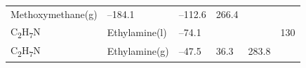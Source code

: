 \documentclass[
  9pt,
]{extbook}
\theoremstyle{definition}
\theoremstyle{definition}
\theoremstyle{definition}
\theoremstyle{remark}
\begin{document}
\begin{longtable}[]{@{}llllll@{}}
\begin{minipage}[t]{0.17\columnwidth}
Methoxymethane(g)\strut
\end{minipage} & \begin{minipage}[t]{0.15\columnwidth}\raggedright
--184.1\strut
\end{minipage} & \begin{minipage}[t]{0.15\columnwidth}\raggedright
--112.6\strut
\end{minipage} & \begin{minipage}[t]{0.14\columnwidth}\raggedright
266.4\strut
\end{minipage} & \begin{minipage}[t]{0.14\columnwidth}\raggedright
\strut
\end{minipage}\tabularnewline
\begin{minipage}[t]{0.07\columnwidth}\raggedright
C\textsubscript{2}H\textsubscript{7}N\strut
\end{minipage} & \begin{minipage}[t]{0.17\columnwidth}\raggedright
Ethylamine(l)\strut
\end{minipage} & \begin{minipage}[t]{0.15\columnwidth}\raggedright
--74.1\strut
\end{minipage} & \begin{minipage}[t]{0.15\columnwidth}\raggedright
\strut
\end{minipage} & \begin{minipage}[t]{0.14\columnwidth}\raggedright
\strut
\end{minipage} & \begin{minipage}[t]{0.14\columnwidth}\raggedright
130\strut
\end{minipage}\tabularnewline
\begin{minipage}[t]{0.07\columnwidth}\raggedright
C\textsubscript{2}H\textsubscript{7}N\strut
\end{minipage} & \begin{minipage}[t]{0.17\columnwidth}\raggedright
Ethylamine(g)\strut
\end{minipage} & \begin{minipage}[t]{0.15\columnwidth}\raggedright
--47.5\strut
\end{minipage} & \begin{minipage}[t]{0.15\columnwidth}\raggedright
36.3\strut
\end{minipage} & \begin{minipage}[t]{0.14\columnwidth}\raggedright
283.8\strut
\end{minipage} & \begin{minipage}[t]{0.14\columnwidth}\raggedright

\end{minipage}
\end{longtable}
\end{document}
